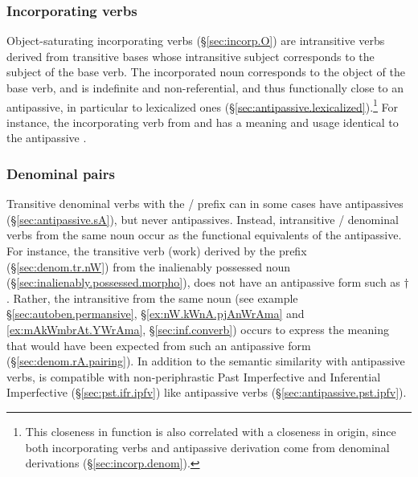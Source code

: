  \subsubsection{Incorporating verbs } \label{sec:antipassive.vs.incorporation}
Object-saturating incorporating verbs (§\ref{sec:incorp.O}) are intransitive verbs derived from transitive bases whose intransitive subject corresponds to the subject of the base verb. The incorporated noun corresponds to the object of the base verb, and is indefinite and non-referential, and thus functionally close to an antipassive, in particular to lexicalized ones (§\ref{sec:antipassive.lexicalized}).\footnote{This closeness in function is also correlated with a closeness in origin, since both incorporating verbs and antipassive derivation come from denominal derivations (§\ref{sec:incorp.denom}). } For instance, the incorporating verb  from   and  has a meaning and usage identical to the antipassive .

 \subsubsection{Denominal pairs } \label{sec:antipassive.vs.denominal.pairs}
Transitive denominal verbs with the / prefix can in some cases have  antipassives (§\ref{sec:antipassive.sA}), but never  antipassives. Instead, intransitive  / denominal verbs from the same noun occur as the functional equivalents of the antipassive. For instance, the transitive verb  (work)  derived by the prefix  (§\ref{sec:denom.tr.nW}) from the inalienably possessed noun  (§\ref{sec:inalienably.possessed.morpho}), does not have an antipassive form such as $\dagger$. Rather, the intransitive  from the same noun (see example §\ref{sec:autoben.permansive}, §\ref{ex:nW.kWnA.pjAnWrAma} and \ref{ex:mAkWmbrAt.YWrAma}, §\ref{sec:inf.converb}) occurs to express the meaning that would have been expected from such an antipassive form (§\ref{sec:denom.rA.pairing}). In addition to the semantic similarity with antipassive verbs,  is compatible with non-periphrastic Past Imperfective and Inferential Imperfective (§\ref{sec:pst.ifr.ipfv}) like antipassive verbs (§\ref{sec:antipassive.pst.ipfv}).

 
